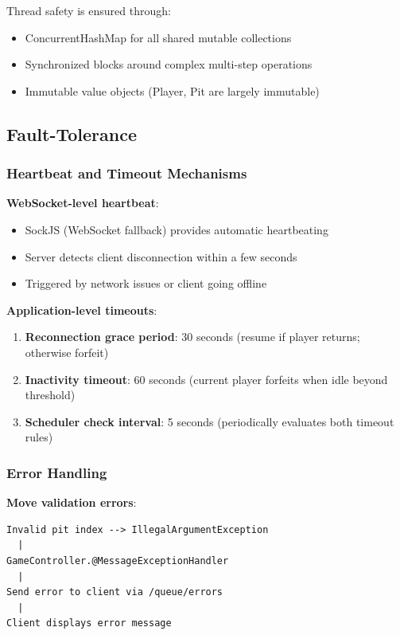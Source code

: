 \documentclass{scrartcl}
\begin{document}
Thread safety is ensured through:

\begin{itemize}
  \item ConcurrentHashMap for all shared mutable collections
  \item Synchronized blocks around complex multi-step operations
  \item Immutable value objects (Player, Pit are largely immutable)
\end{itemize}

\subsection{Fault-Tolerance}\label{fault-tolerance}


\subsubsection{Heartbeat and Timeout Mechanisms}

\textbf{WebSocket-level heartbeat}:

\begin{itemize}
  \item SockJS (WebSocket fallback) provides automatic heartbeating
  \item Server detects client disconnection within a few seconds
  \item Triggered by network issues or client going offline
\end{itemize}

\textbf{Application-level timeouts}:

\begin{enumerate}
  \item \textbf{Reconnection grace period}: 30 seconds (resume if player returns; otherwise forfeit)
  \item \textbf{Inactivity timeout}: 60 seconds (current player forfeits when idle beyond threshold)
  \item \textbf{Scheduler check interval}: 5 seconds (periodically evaluates both timeout rules)
\end{enumerate}

\subsubsection{Error Handling}

\textbf{Move validation errors}:

\begin{lstlisting}
Invalid pit index --> IllegalArgumentException
  |
GameController.@MessageExceptionHandler
  |
Send error to client via /queue/errors
  |
Client displays error message
\end{lstlisting}
\end{document}
